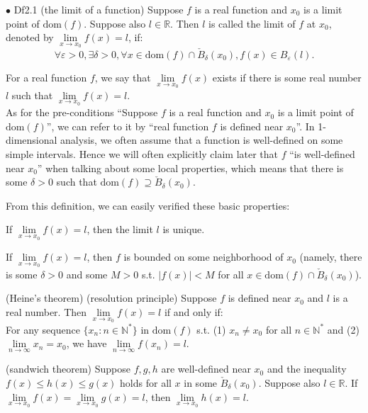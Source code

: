 \documentclass{article}
\begin{document}
\begin{Df}{$\bullet$ Df2.1 (the limit of a function)}
    Suppose $f$ is a real function and $x_0$ is a limit point of $\text{dom}(f)$. Suppose also $l\in\mathbb{R}$. Then $l$ is called the limit of $f$ at $x_0$, denoted by $\lim\limits_{x\rightarrow x_0}f(x) = l$, if:
    $$\forall\varepsilon>0, \exists\delta>0, \forall x\in\text{dom}(f)\cap\check{B}_\delta(x_0), f(x)\in B_\varepsilon(l).$$
\end{Df}

\begin{Rmk}{}
    \textcolor{Df}{For a real function $f$, we say that $\lim\limits_{x\to x_0} f(x)$ exists if there is some real number $l$ such that $\lim\limits_{x\to x_0} f(x) = l$.}\\
    \textcolor{Df}{As for the pre-conditions ``Suppose $f$ is a real function and $x_0$ is a limit point of $\text{dom}(f)$'', we can refer to it by ``real function $f$ is defined near $x_0$''.} In 1-dimensional analysis, we often assume that a function is well-defined on some simple intervals. \textcolor{Df}{Hence we will often explicitly claim later that $f$ ``is well-defined near $x_0$'' when talking about some local properties, which means that there is some $\delta>0$ such that $\text{dom}(f)\supseteq \check{B}_\delta(x_0)$.}\\
    \textcolor{Th}{From this definition, we can easily verified these basic properties:
    \begin{compactenum}
        \item If $\lim\limits_{x\rightarrow x_0}f(x) = l$, then the limit $l$ is unique.
        \item If $\lim\limits_{x\rightarrow x_0}f(x) = l$, then $f$ is bounded on some neighborhood of $x_0$ (namely, there is some $\delta>0$ and some $M>0$ s.t. $|f(x)|<M$ for all $x\in\text{dom}(f)\cap\check{B}_\delta(x_0)$).
        \item (Heine's theorem) (resolution principle) Suppose $f$ is defined near $x_0$ and $l$ is a real number. Then $\lim\limits_{x\rightarrow x_0}f(x) = l$ if and only if:\\
        For any sequence $\{x_n:n\in\mathbb{N^\ast}\}$ in $\text{dom}(f)$ s.t. (1) $x_n\neq x_0$ for all $n\in\mathbb{N^\ast}$ and (2) $\lim\limits_{n\rightarrow\infty}x_n = x_0$, we have $\lim\limits_{n\rightarrow\infty}f(x_n) = l$.
        \item (sandwich theorem) Suppose $f, g, h$ are well-defined near $x_0$ and the inequality $f(x)\leq h(x)\leq g(x)$ holds for all $x$ in some $\check{B}_\delta(x_0)$. Suppose also $l\in\mathbb{R}$. If $\lim\limits_{x\to x_0} f(x) = \lim\limits_{x\to x_0} g(x) = l$, then $\lim\limits_{x\to x_0} h(x) = l$.

\end{compactenum}}
\end{Rmk}
\end{document}
